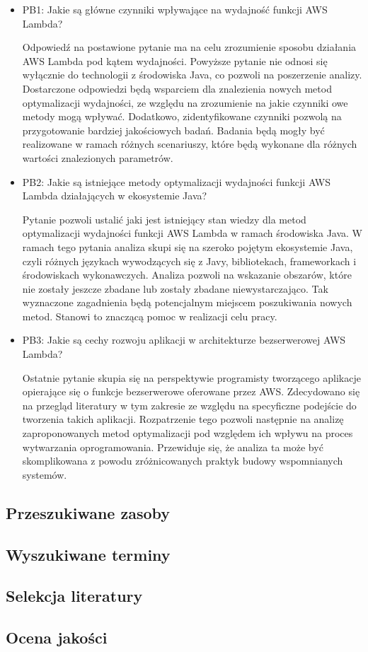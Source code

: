 \begin{itemize}
    \item PB1: Jakie są główne czynniki wpływające na wydajność funkcji AWS Lambda?
    
    Odpowiedź na postawione pytanie ma na celu zrozumienie sposobu działania AWS Lambda pod kątem wydajności.
    Powyższe pytanie nie odnosi się wyłącznie do technologii z środowiska Java, co pozwoli na poszerzenie analizy.
    Dostarczone odpowiedzi będą wsparciem dla znalezienia nowych metod optymalizacji wydajności, ze względu na zrozumienie na jakie czynniki owe metody mogą wpływać.
    Dodatkowo, zidentyfikowane czynniki pozwolą na przygotowanie bardziej jakościowych badań. 
    Badania będą mogły być realizowane w ramach różnych scenariuszy, które będą wykonane dla różnych wartości znalezionych parametrów.  

    \item PB2: Jakie są istniejące metody optymalizacji wydajności funkcji AWS Lambda działających w ekosystemie Java?
    
    Pytanie pozwoli ustalić jaki jest istniejący stan wiedzy dla metod optymalizacji wydajności funkcji AWS Lambda w ramach środowiska Java.
    W ramach tego pytania analiza skupi się na szeroko pojętym ekosystemie Java, czyli różnych językach wywodzących się z Javy, bibliotekach, frameworkach i środowiskach wykonawczych.
    Analiza pozwoli na wskazanie obszarów, które nie zostały jeszcze zbadane lub zostały zbadane niewystarczająco.
    Tak wyznaczone zagadnienia będą potencjalnym miejscem poszukiwania nowych metod.
    Stanowi to znaczącą pomoc w realizacji celu pracy.

    \item PB3: Jakie są cechy rozwoju aplikacji w architekturze bezserwerowej AWS Lambda?
    
    Ostatnie pytanie skupia się na perspektywie programisty tworzącego aplikacje opierające się o funkcje bezserwerowe oferowane przez AWS.
    Zdecydowano się na przegląd literatury w tym zakresie ze względu na specyficzne podejście do tworzenia takich aplikacji.
    Rozpatrzenie tego pozwoli następnie na analizę zaproponowanych metod optymalizacji pod względem ich wpływu na proces wytwarzania oprogramowania.
    Przewiduje się, że analiza ta może być skomplikowana z powodu zróżnicowanych praktyk budowy wspomnianych systemów.

\end{itemize}

\subsection{Przeszukiwane zasoby}\label{chapter:przeszukiwane_zasoby}

\subsection{Wyszukiwane terminy}\label{chapter:wyszukiwane_terminy}

\subsection{Selekcja literatury}\label{chapter:selekcja_literatury}

\subsection{Ocena jakości}\label{chapter:ocena_jakosci}

